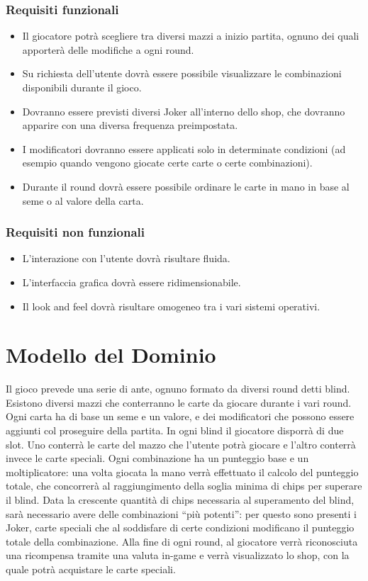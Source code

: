\documentclass[a4paper,12pt]{report}
\begin{document}
\subsubsection{Requisiti funzionali}
\begin{itemize}
  \item Il giocatore potrà scegliere tra diversi mazzi a inizio partita, ognuno dei quali apporterà delle modifiche a ogni round.
  \item Su richiesta dell'utente dovrà essere possibile visualizzare le combinazioni disponibili durante il gioco.
  \item Dovranno essere previsti diversi Joker all’interno dello shop, che dovranno apparire con una diversa frequenza preimpostata.
  \item I modificatori dovranno essere applicati solo in determinate condizioni (ad esempio quando vengono giocate certe carte o certe combinazioni).
  \item Durante il round dovrà essere possibile ordinare le carte in mano in base al seme o al valore della carta.
\end{itemize}

\subsubsection{Requisiti non funzionali}
\begin{itemize}
	\item L’interazione con l’utente dovrà risultare fluida.
	\item L’interfaccia grafica dovrà essere ridimensionabile.
  	\item Il look and feel dovrà risultare omogeneo tra i vari sistemi operativi.
\end{itemize}

\section{Modello del Dominio}
Il gioco prevede una serie di ante, ognuno formato da diversi round detti blind.
Esistono diversi mazzi che conterranno le carte da giocare durante i vari round.
Ogni carta ha di base un seme e un valore, e dei modificatori che possono essere aggiunti col proseguire della partita.
In ogni blind il giocatore disporrà di due slot. Uno conterrà le carte del mazzo che l’utente potrà giocare e l’altro conterrà invece le carte speciali.
Ogni combinazione ha un punteggio base e un moltiplicatore: una volta giocata la mano verrà effettuato il calcolo del punteggio totale, che concorrerà al raggiungimento della soglia minima di chips per superare il blind.
Data la crescente quantità di chips necessaria al superamento del blind, sarà necessario avere delle combinazioni “più potenti”: per questo sono presenti i Joker, carte speciali che al soddisfare di certe condizioni modificano il punteggio totale della combinazione.
Alla fine di ogni round, al giocatore verrà riconosciuta una ricompensa tramite una valuta in-game e verrà visualizzato lo shop, con la quale potrà acquistare le carte speciali.
\end{document}
